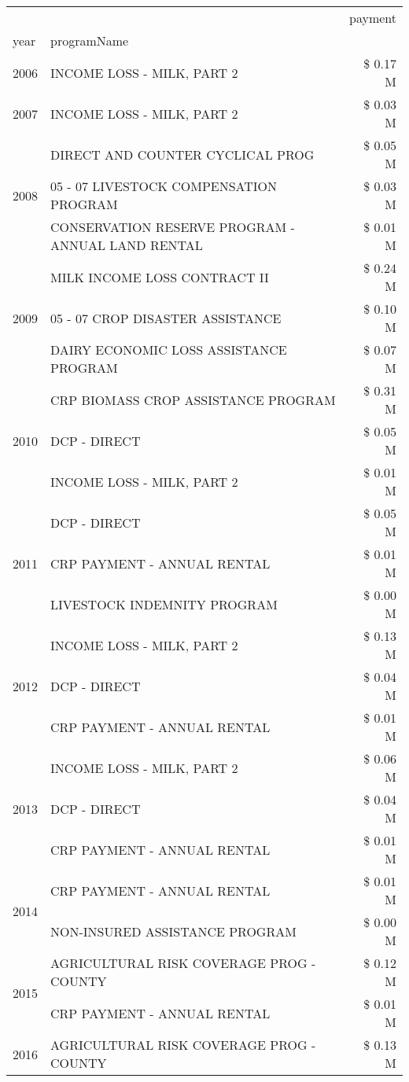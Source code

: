 \begin{tabular}{llr}
\toprule
 &  & payment \\
year & programName &  \\
\midrule
2006 & INCOME LOSS - MILK, PART 2 & \$ 0.17 M \\
\cline{1-3}
2007 & INCOME LOSS - MILK, PART 2 & \$ 0.03 M \\
\cline{1-3}
\multirow[t]{3}{*}{2008} & DIRECT AND COUNTER CYCLICAL PROG & \$ 0.05 M \\
 & 05 - 07 LIVESTOCK COMPENSATION PROGRAM & \$ 0.03 M \\
 & CONSERVATION RESERVE PROGRAM - ANNUAL LAND RENTAL & \$ 0.01 M \\
\cline{1-3}
\multirow[t]{3}{*}{2009} & MILK INCOME LOSS CONTRACT II & \$ 0.24 M \\
 & 05 - 07 CROP DISASTER ASSISTANCE & \$ 0.10 M \\
 & DAIRY ECONOMIC LOSS ASSISTANCE PROGRAM & \$ 0.07 M \\
\cline{1-3}
\multirow[t]{3}{*}{2010} & CRP BIOMASS CROP ASSISTANCE PROGRAM & \$ 0.31 M \\
 & DCP - DIRECT & \$ 0.05 M \\
 & INCOME LOSS - MILK, PART 2 & \$ 0.01 M \\
\cline{1-3}
\multirow[t]{3}{*}{2011} & DCP - DIRECT & \$ 0.05 M \\
 & CRP PAYMENT - ANNUAL RENTAL & \$ 0.01 M \\
 & LIVESTOCK INDEMNITY PROGRAM & \$ 0.00 M \\
\cline{1-3}
\multirow[t]{3}{*}{2012} & INCOME LOSS - MILK, PART 2 & \$ 0.13 M \\
 & DCP - DIRECT & \$ 0.04 M \\
 & CRP PAYMENT - ANNUAL RENTAL & \$ 0.01 M \\
\cline{1-3}
\multirow[t]{3}{*}{2013} & INCOME LOSS - MILK, PART 2 & \$ 0.06 M \\
 & DCP - DIRECT & \$ 0.04 M \\
 & CRP PAYMENT - ANNUAL RENTAL & \$ 0.01 M \\
\cline{1-3}
\multirow[t]{2}{*}{2014} & CRP PAYMENT - ANNUAL RENTAL & \$ 0.01 M \\
 & NON-INSURED ASSISTANCE PROGRAM & \$ 0.00 M \\
\cline{1-3}
\multirow[t]{2}{*}{2015} & AGRICULTURAL RISK COVERAGE PROG - COUNTY & \$ 0.12 M \\
 & CRP PAYMENT - ANNUAL RENTAL & \$ 0.01 M \\
\cline{1-3}
\multirow[t]{3}{*}{2016} & AGRICULTURAL RISK COVERAGE PROG - COUNTY & \$ 0.13 M \\

\end{tabular}
